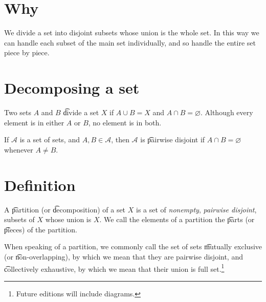 
\section*{Why}

We divide a set into disjoint subsets whose union is the whole set.
In this way we can handle each subset of the main set individually, and so handle the entire set piece by piece.

\section*{Decomposing a set}

Two sets $A$ and $B$ \t{divide} a set $X$ if $A \cup B = X$ and $A \cap  B = \varnothing$.
Although every element is in either $A$ or $B$, no element is in both.

If $\mathcal{A} $ is a set of sets, and $A, B \in \mathcal{A} $, then $\mathcal{A} $ is \t{pairwise disjoint} if $A \cap  B = \varnothing$ whenever $A \neq B$.

\section*{Definition}

A \t{partition} (or \t{decomposition}) of a set $X$ is a set of \textit{nonempty}, \textit{pairwise disjoint}, subsets of $X$ whose union is $X$.
We call the elements of a partition the \t{parts} (or \t{pieces}) of the partition.

When speaking of a partition, we commonly call the set of sets \t{mutually exclusive} (or \t{non-overlapping}), by which we mean that they are pairwise disjoint, and \t{collectively exhaustive}, by which we mean that their union is full set.\footnote{Future editions will include diagrams.}

\blankpage
